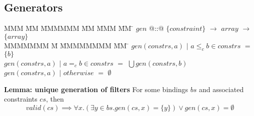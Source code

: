 \subsection{Generators}

\begin{tabbing}
MMM       \= MM \= MMMMMM \= MM \= MMM \= MM \= \kill
$gen$   \> @::@  \> $\{constraint\}$  \> $\to$ \> $array$ \> $\to$ \> $\{array\}$ \\
MMMMMMM                 \= M  \= MMMMMMMM \= MM \= \kill
$gen(constrs, a)$ \> $|$ \> $a \le_c b \in constrs$ \> $=$ \> $\{b\}$                        \\
$gen(constrs, a)$ \> $|$ \> $a =_c b \in constrs$   \> $=$ \> $\bigcup gen(constrs, b)$                        \\
$gen(constrs, a)$ \> $|$ \> $otherwise$             \> $=$ \> $\emptyset$                        \\
\end{tabbing}

\textbf{Lemma: unique generation of filters}
For some bindings $bs$ and associated constraints $cs$, then
\[
valid(cs) \implies \forall x. (\exists y \in bs. gen(cs, x) = \{y\}) \vee gen(cs, x) = \emptyset
\]

